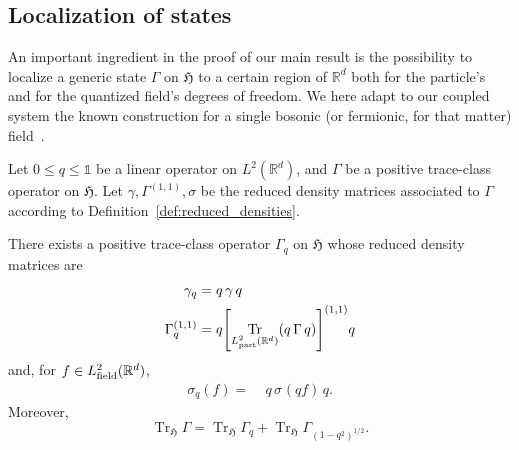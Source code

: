 \documentclass[AHL,Unicode,longabstracts,published]{cedram}
\DeclareMathOperator{\Tr}{Tr}
\DeclareMathOperator{\partt}{part}
\DeclareMathOperator{\field}{field}
\newcommand{\R}{\mathbb{R}}
\newcommand{\gH}{\mathfrak{H}}
\newcommand{\1}{\mathds{1}}
\let\oldin\in
\renewcommand{\in}{\mathchoice{\oldin}{\oldin}{\,\oldin\,}{\,\oldin\,}}
\let\originalleft\left
\let\originalright\right
\renewcommand{\left}{\mathopen{}\mathclose\bgroup\originalleft}
\renewcommand{\right}{\aftergroup\egroup\originalright}
\begin{document}
\subsection{Localization of states}

An important ingredient in the proof of our main result is the possibility to localize a generic state $\Gamma$ on $ \gH$ to a certain region of $\R^d$ both for the particle's and for the quantized field's degrees of freedom. We here adapt to our coupled system the known construction for a single bosonic (or fermionic, for that matter) field~\cite{Ammari-04,DerGer-99,HaiLewSol-09a,HaiLewSol-09b,Lewin-11}.

\begin{prop} \label{prop:def_localization}
Let $0\le q \le \1$ be a linear operator on $L^2(\R^d)$, and $\Gamma$ be a positive trace-class operator on $ \gH$. Let $\gamma,\Gamma^{(1,1)},\sigma$ be the reduced density matrices associated to $\Gamma$ according to Definition~\ref{def:reduced_densities}.

There exists a positive trace-class operator $\Gamma_{q}$ on $ \gH$ whose reduced density matrices are
\begin{align}\label{eq:localized_density_particle}
\gamma_q=\;&q\,\gamma\,q\\
\Gamma_q^{(1,1)}=\;&q\left[\Tr_{L^2_{\partt}(\R^d)} \left(q \,\Gamma\, q\right) \right]^{(1,1)}q \label{eq:localized_density_field}
\end{align}
and, for $f\in L^2_{\field}(\R^d)$,
\begin{align}\label{eq:localized_density_interaction}
\sigma_{q}(f)=\;& q \,\sigma_{}(q f)\, q.
\end{align}
Moreover,
\begin{equation}\label{eq:localized_traces}
\Tr_{ \gH} \Gamma = \Tr_{ \gH} \Gamma_q+\Tr_{ \gH}\Gamma_{(1-q^2)^{1/2}}.
\end{equation}
\end{prop}
\end{document}
